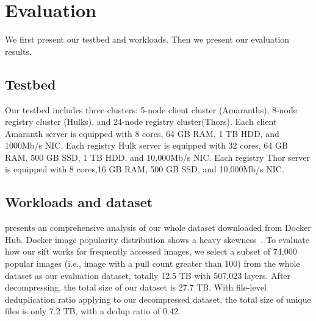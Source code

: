 \section{ Evaluation}
\label{sec:Evaluation}


We first present our testbed and workloads.
Then we present our evaluation results.
\subsection{Testbed}

Our testbed includes three clusters: 
5-node client cluster (Amaranths),
8-node registry cluster (Hulks), and
24-node registry cluster(Thors).
Each client Amaranth server is equipped with 8 cores, 64 GB RAM, 1 TB HDD, and 1000Mb/s NIC.
Each registry Hulk server is equipped with 32 cores, 64 GB RAM, 500 GB SSD, 1 TB HDD, and 10,000Mb/s NIC. 
Each registry Thor server is equipped with 8 cores,16 GB RAM, 500 GB SSD, and 10,000Mb/s NIC. 
\subsection{Workloads and dataset}
\cite{xxx} presents an comprehensive analysis of our whole dataset downloaded from Docker Hub. 
Docker image popularity distribution shows a heavy skewness~\cite{xxx}.
To evaluate how our sift works for frequently accessed images,
we select a subset of 74,000 popular images (i.e., image with a pull count greater than 100) from the whole dataset 
as our evaluation dataset, 
totally 12.5 TB with 507,023 layers.
After decompressing,  the total size of our dataset is 27.7 TB.
With file-level deduplication ratio applying to our decompressed dataset, 
the total size of unique files is only 7.2 TB, with a dedup ratio of 0.42.

